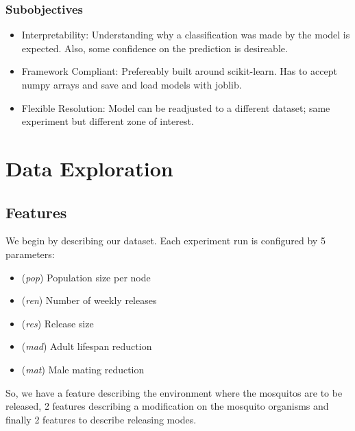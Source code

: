 \documentclass[12pt,letterpaper]{article}
\begin{document}
\subsubsection{Subobjectives}
\begin{itemize}
    \item Interpretability: Understanding why a classification was made by the model is expected. Also, some confidence on the prediction is desireable.
    \item Framework Compliant: Prefereably built around scikit-learn. Has to accept numpy arrays and save and load models with joblib.
    \item Flexible Resolution: Model can be readjusted to a different dataset; same experiment but different zone of interest.
\end{itemize}

\section{Data Exploration}
\subsection{Features}
We begin by describing our dataset. Each experiment run is configured by 5 parameters:
\begin{itemize}
    \item (\emph{pop}) Population size per node %
    \item (\emph{ren}) Number of weekly releases
    \item (\emph{res}) Release size %
    \item (\emph{mad}) Adult lifespan reduction %
    \item (\emph{mat}) Male mating reduction    %
\end{itemize}
So, we have a feature describing the environment where the mosquitos are to be released, 2 features describing a modification
on the mosquito organisms and finally 2 features to describe releasing modes.
\end{document}
